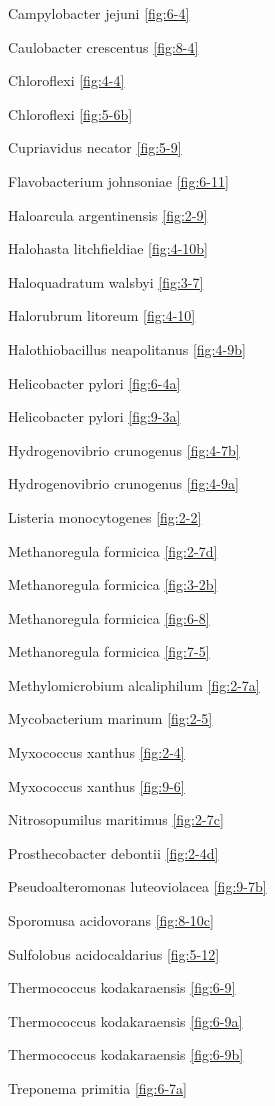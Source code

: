 \documentclass[]{tufte-book}
\begin{document}
Campylobacter jejuni \ref{fig:6-4}

Caulobacter crescentus \ref{fig:8-4}

Chloroflexi \ref{fig:4-4}

Chloroflexi \ref{fig:5-6b}

Cupriavidus necator \ref{fig:5-9}

Flavobacterium johnsoniae \ref{fig:6-11}

Haloarcula argentinensis \ref{fig:2-9}

Halohasta litchfieldiae \ref{fig:4-10b}

Haloquadratum walsbyi \ref{fig:3-7}

Halorubrum litoreum \ref{fig:4-10}

Halothiobacillus neapolitanus \ref{fig:4-9b}

Helicobacter pylori \ref{fig:6-4a}

Helicobacter pylori \ref{fig:9-3a}

Hydrogenovibrio crunogenus \ref{fig:4-7b}

Hydrogenovibrio crunogenus \ref{fig:4-9a}

Listeria monocytogenes \ref{fig:2-2}

Methanoregula formicica \ref{fig:2-7d}

Methanoregula formicica \ref{fig:3-2b}

Methanoregula formicica \ref{fig:6-8}

Methanoregula formicica \ref{fig:7-5}

Methylomicrobium alcaliphilum \ref{fig:2-7a}

Mycobacterium marinum \ref{fig:2-5}

Myxococcus xanthus \ref{fig:2-4}

Myxococcus xanthus \ref{fig:9-6}

Nitrosopumilus maritimus \ref{fig:2-7c}

Prosthecobacter debontii \ref{fig:2-4d}

Pseudoalteromonas luteoviolacea \ref{fig:9-7b}

Sporomusa acidovorans \ref{fig:8-10c}

Sulfolobus acidocaldarius \ref{fig:5-12}

Thermococcus kodakaraensis \ref{fig:6-9}

Thermococcus kodakaraensis \ref{fig:6-9a}

Thermococcus kodakaraensis \ref{fig:6-9b}

Treponema primitia \ref{fig:6-7a}
\end{document}
